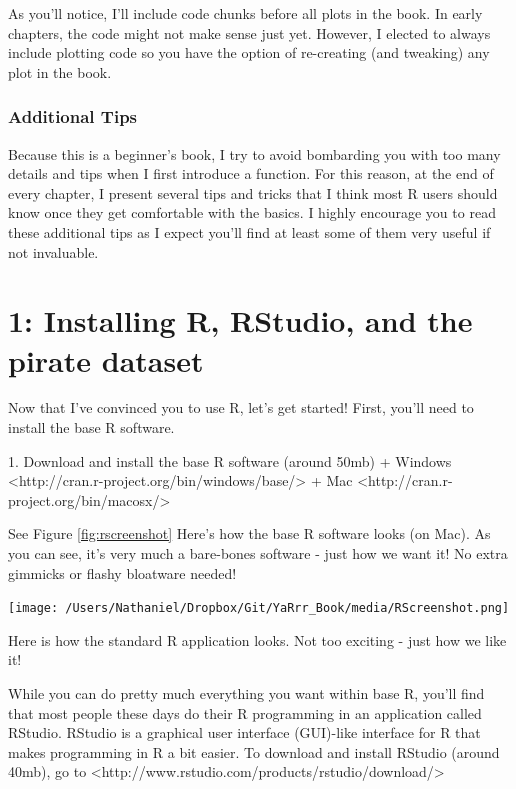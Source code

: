 \documentclass{tufte-book}\usepackage[]{graphicx}\usepackage[]{color}
\begin{document}
As you'll notice, I'll include code chunks before all plots in the book. In early chapters, the code might not make sense just yet. However, I elected to always include plotting code so you have the option of re-creating (and tweaking) any plot in the book.

\subsection{Additional Tips}

Because this is a beginner's book, I try to avoid bombarding you with too many details and tips when I first introduce a function. For this reason, at the end of every chapter, I present several tips and tricks that I think most R users should know once they get comfortable with the basics. I highly encourage you to read these additional tips as I expect you'll find at least some of them very useful if not invaluable.


\mainmatter


\chapter{1: Installing R, RStudio, and the pirate dataset}
\label{ch:1}


Now that I've convinced you to use R, let's get started! First, you'll need to install the base R software.

1. Download and install the base R software (around 50mb)
    + Windows <http://cran.r-project.org/bin/windows/base/>
    + Mac <http://cran.r-project.org/bin/macosx/>

See Figure \ref{fig:rscreenshot} Here's how the base R software looks (on Mac). As you can see, it's very much a bare-bones software - just how we want it! No extra gimmicks or flashy bloatware needed!

\begin{marginfigure}
\texttt{[image: /Users/Nathaniel/Dropbox/Git/YaRrr\_Book/media/RScreenshot.png]}
\caption{Here is how the standard R application looks. Not too exciting - just how we like it!}
\label{fig:rscreenshot}
\end{marginfigure}

While you can do pretty much everything you want within base R, you'll find that most people these days do their R programming in an application called RStudio. RStudio is a graphical user interface (GUI)-like interface for R that makes programming in R a bit easier. To download and install RStudio (around 40mb), go to <http://www.rstudio.com/products/rstudio/download/>
\end{document}
